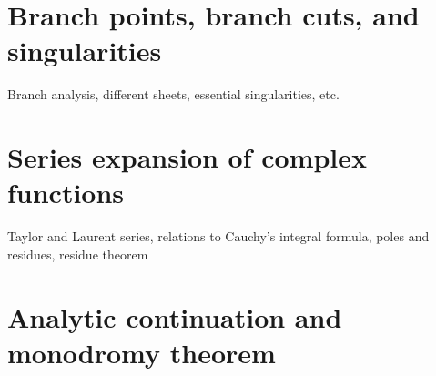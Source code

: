 \section{Branch points, branch cuts, and singularities}
Branch analysis, different sheets, essential singularities, etc.
\section{Series expansion of complex functions}
Taylor and Laurent series, relations to Cauchy's integral formula, poles and residues, residue theorem
\section{Analytic continuation and monodromy theorem}
